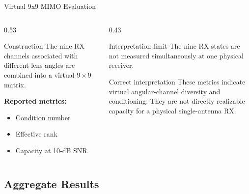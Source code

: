 \begin{frame}[t,shrink=12]{Virtual 9x9 MIMO Evaluation}
    \begin{columns}[T,onlytextwidth]
        \begin{column}{0.53\textwidth}
            \begin{block}{Construction}
                The nine RX channels associated with different lens angles
                are combined into a virtual $9\times9$ matrix.
            \end{block}
            \textbf{Reported metrics:}
            \begin{itemize}
                \item Condition number
                \item Effective rank
                \item Capacity at 10-dB SNR
            \end{itemize}
        \end{column}
        \begin{column}{0.43\textwidth}
            \begin{alertblock}{Interpretation limit}
                The nine RX states are not measured simultaneously at one
                physical receiver.
            \end{alertblock}
            \begin{exampleblock}{Correct interpretation}
                These metrics indicate virtual angular-channel diversity and
                conditioning. They are not directly realizable capacity for a
                physical single-antenna RX.
            \end{exampleblock}
        \end{column}
    \end{columns}
\end{frame}

\subsection{Aggregate Results}


